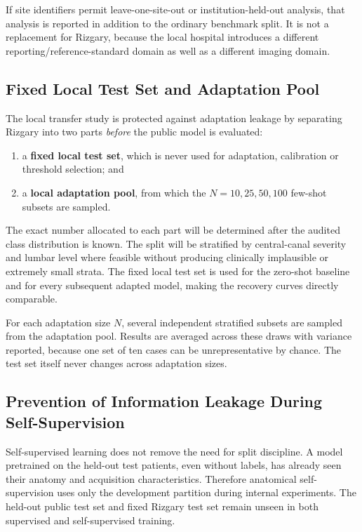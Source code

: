 If site identifiers permit leave-one-site-out or institution-held-out analysis,
that analysis is reported in addition to the ordinary benchmark split. It is not
a replacement for Rizgary, because the local hospital introduces a different
reporting/reference-standard domain as well as a different imaging domain.

\subsection{Fixed Local Test Set and Adaptation Pool}
\label{sec:method-local-split}

The local transfer study is protected against adaptation leakage by separating
Rizgary into two parts \emph{before} the public model is evaluated:

\begin{enumerate}
  \item a \textbf{fixed local test set}, which is never used for adaptation,
        calibration or threshold selection; and
  \item a \textbf{local adaptation pool}, from which the $N=10,25,50,100$
        few-shot subsets are sampled.
\end{enumerate}

The exact number allocated to each part will be determined after the audited
class distribution is known. The split will be stratified by central-canal
severity and lumbar level where feasible without producing clinically
implausible or extremely small strata. The fixed local test set is used for the
zero-shot baseline and for every subsequent adapted model, making the recovery
curves directly comparable.

For each adaptation size $N$, several independent stratified subsets are sampled
from the adaptation pool. Results are averaged across these draws with variance
reported, because one set of ten cases can be unrepresentative by chance. The
test set itself never changes across adaptation sizes.

\subsection{Prevention of Information Leakage During Self-Supervision}
\label{sec:method-ssl-leakage}

Self-supervised learning does not remove the need for split discipline. A model
pretrained on the held-out test patients, even without labels, has already seen
their anatomy and acquisition characteristics. Therefore anatomical
self-supervision uses only the development partition during internal
experiments. The held-out public test set and fixed Rizgary test set remain
unseen in both supervised and self-supervised training.

